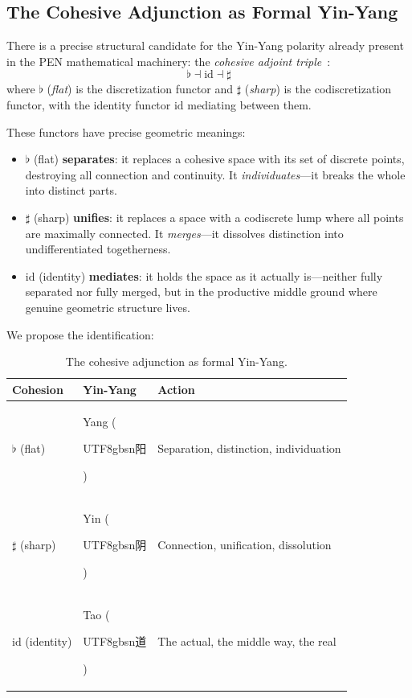 \documentclass[12pt,a4paper]{article}
\newcommand{\flatmod}{\flat}
\newcommand{\sharpmod}{\sharp}
\begin{document}
\subsection{The Cohesive Adjunction as Formal Yin-Yang}
\label{sec:adjunction}

There is a precise structural candidate for the Yin-Yang polarity already present in the PEN mathematical machinery: the \emph{cohesive adjoint triple}~\cite{schreiber, lawvere}:
\begin{equation}
\flatmod \dashv \mathrm{id} \dashv \sharpmod
\label{eq:adjunction}
\end{equation}
where $\flatmod$ (\emph{flat}) is the discretization functor and $\sharpmod$ (\emph{sharp}) is the codiscretization functor, with the identity functor $\mathrm{id}$ mediating between them.

These functors have precise geometric meanings:

\begin{itemize}[leftmargin=2em]
\item $\flatmod$ (flat) \textbf{separates}: it replaces a cohesive space with its set of discrete points, destroying all connection and continuity. It \emph{individuates}---it breaks the whole into distinct parts.

\item $\sharpmod$ (sharp) \textbf{unifies}: it replaces a space with a codiscrete lump where all points are maximally connected. It \emph{merges}---it dissolves distinction into undifferentiated togetherness.

\item $\mathrm{id}$ (identity) \textbf{mediates}: it holds the space as it actually is---neither fully separated nor fully merged, but in the productive middle ground where genuine geometric structure lives.
\end{itemize}

We propose the identification:

\begin{table}[h]
\centering
\renewcommand{\arraystretch}{1.3}
\begin{tabular}{@{}lll@{}}
\toprule
\textbf{Cohesion} & \textbf{Yin-Yang} & \textbf{Action} \\
\midrule
$\flatmod$ (flat) & Yang (\begin{CJK}{UTF8}{gbsn}阳\end{CJK}) & Separation, distinction, individuation \\
$\sharpmod$ (sharp) & Yin (\begin{CJK}{UTF8}{gbsn}阴\end{CJK}) & Connection, unification, dissolution \\
$\mathrm{id}$ (identity) & Tao (\begin{CJK}{UTF8}{gbsn}道\end{CJK}) & The actual, the middle way, the real \\
\bottomrule
\end{tabular}
\caption{The cohesive adjunction as formal Yin-Yang.}
\label{tab:yinyang}
\end{table}
\end{document}
